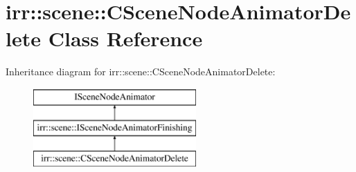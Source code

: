 \hypertarget{classirr_1_1scene_1_1_c_scene_node_animator_delete}{\section{irr\-:\-:scene\-:\-:C\-Scene\-Node\-Animator\-Delete Class Reference}
\label{classirr_1_1scene_1_1_c_scene_node_animator_delete}
}
Inheritance diagram for irr\-:\-:scene\-:\-:C\-Scene\-Node\-Animator\-Delete\-:\begin{figure}[H]
\begin{center}
\leavevmode
\includegraphics[height=3.000000cm]{classirr_1_1scene_1_1_c_scene_node_animator_delete}
\end{center}
\end{figure}
